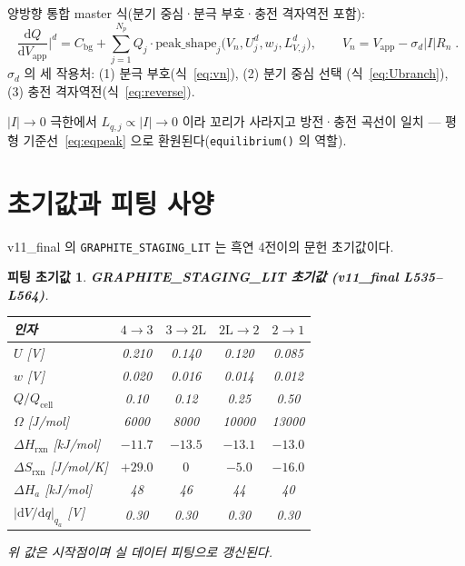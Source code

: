 \documentclass[11pt,a4paper]{article}
\newtheorem*{parambox}{피팅 초기값}
\newcommand{\dd}{\mathrm{d}}
\newcommand{\app}{\mathrm{app}}
\newcommand{\bg}{\mathrm{bg}}
\newcommand{\cell}{\mathrm{cell}}
\begin{document}
양방향 통합 master 식(분기 중심·분극 부호·충전 격자역전 포함):
\begin{equation}
\boxed{\;\frac{\dd Q}{\dd V_\app}\bigg|^d
= C_\bg + \sum_{j=1}^{N_p} Q_j \cdot \text{peak\_shape}_j\bigl(V_n, U_j^d, w_j, L_{V,j}^d\bigr),
\qquad V_n = V_\app - \sigma_d|I|R_n\;.}
\label{eq:master}
\end{equation}
$\sigma_d$ 의 세 작용처: (1) 분극 부호(식~\eqref{eq:vn}), (2) 분기 중심 선택
(식~\eqref{eq:Ubranch}), (3) 충전 격자역전(식~\eqref{eq:reverse}).

$|I|\to0$ 극한에서 $L_{q,j}\propto|I|\to0$ 이라 꼬리가 사라지고 방전·충전 곡선이
일치 — 평형 기준선~\eqref{eq:eqpeak} 으로 환원된다(\texttt{equilibrium()} 의 역할).

\section{초기값과 피팅 사양}\label{sec:fitting}

v11\_final 의 \texttt{GRAPHITE\_STAGING\_LIT} 는 흑연 4전이의 문헌 초기값이다.

\begin{parambox}
\textbf{GRAPHITE\_STAGING\_LIT 초기값 (v11\_final L535--L564)}.
\begin{center}
\renewcommand{\arraystretch}{1.25}
\begin{tabular}{p{} cccc}
\toprule
인자 & $4\to3$ & $3\to2\mathrm L$ & $2\mathrm L\to2$ & $2\to1$ \\
\midrule
$U$ [V] & 0.210 & 0.140 & 0.120 & 0.085 \\
$w$ [V] & 0.020 & 0.016 & 0.014 & 0.012 \\
$Q/Q_\cell$ & 0.10 & 0.12 & 0.25 & 0.50 \\
$\Omega$ [J/mol] & 6000 & 8000 & 10000 & 13000 \\
$\Delta H_\text{rxn}$ [kJ/mol] & $-11.7$ & $-13.5$ & $-13.1$ & $-13.0$ \\
$\Delta S_\text{rxn}$ [J/mol/K] & $+29.0$ & $0$ & $-5.0$ & $-16.0$ \\
$\Delta H_a$ [kJ/mol] & 48 & 46 & 44 & 40 \\
$|\dd V/\dd q|_{q_a}$ [V] & 0.30 & 0.30 & 0.30 & 0.30 \\
\bottomrule
\end{tabular}
\end{center}
위 값은 시작점이며 실 데이터 피팅으로 갱신된다.
\end{parambox}
\end{document}
